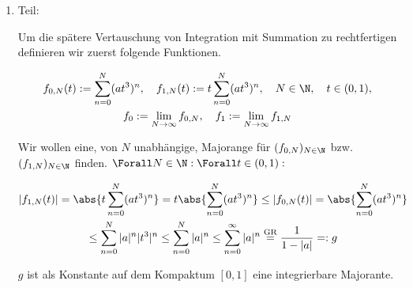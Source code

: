 \begin{solution}

\phantom{}

\begin{enumerate}[label = \arabic*.]

    \item Teil:

    Um die spätere Vertauschung von Integration mit Summation zu rechtfertigen definieren wir zuerst folgende Funktionen.

    \begin{gather*}
        f_{0, N}(t)
        :=
        \sum_{n=0}^N
        (a t^3)^n,
        \quad
        f_{1, N}(t)
        :=
        t
        \sum_{n=0}^N
        (a t^3)^n,
        \quad
        N \in \N,
        \quad
        t \in (0, 1), \\
        f_0
        :=
        \lim_{N \to \infty}
        f_{0, N},
        \quad
        f_1
        :=
        \lim_{N \to \infty}
        f_{1, N}
    \end{gather*}

    Wir wollen eine, von $N$ unabhängige, Majorange für $(f_{0, N})_{N \in \N}$ bzw. $(f_{1, N})_{N \in \N}$ finden.
    $\Forall N \in \N: \Forall t \in (0, 1):$

    \begin{multline*}
        |f_{1, N}(t)|
        =
        \abs
        {
            t
            \sum_{n=0}^N
            (a t^3)^n
        }
        =
        t
        \abs
        {
            \sum_{n=0}^N
            (a t^3)^n
        }
        \leq
        |f_{0, N}(t)|
        =
        \abs
        {
            \sum_{n=0}^N
            (a t^3)^n
        } \\
        \leq
        \sum_{n=0}^N
        |a|^n |t^3|^n
        \leq
        \sum_{n=0}^N
        |a|^n
        \leq
        \sum_{n=0}^\infty
        |a|^n
        \stackrel
        {
            \mathrm{GR}
        }{=}
        \frac{1}{1 - |a|}
        =:
        g
    \end{multline*}

    $g$ ist als Konstante auf dem Kompaktum $[0, 1]$ eine integrierbare Majorante.


\end{enumerate}
\end{solution}
